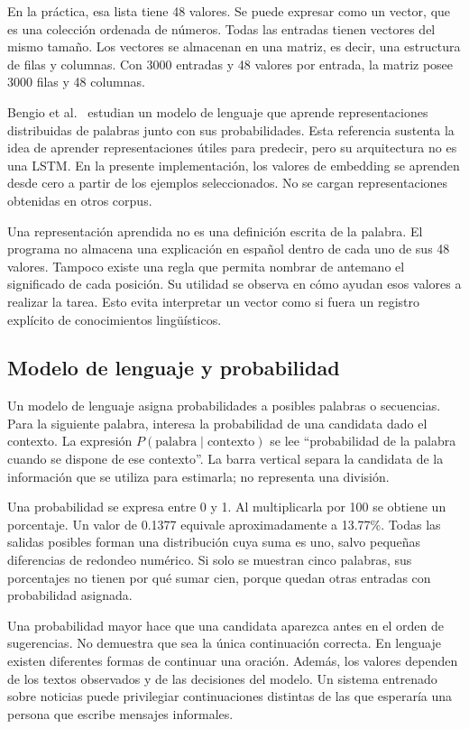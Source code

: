 En la práctica, esa lista tiene 48 valores. Se puede expresar como un vector, que es una colección ordenada de números. Todas las entradas tienen vectores del mismo tamaño. Los vectores se almacenan en una matriz, es decir, una estructura de filas y columnas. Con 3000 entradas y 48 valores por entrada, la matriz posee 3000 filas y 48 columnas.

Bengio et al.~\cite{bengio2003} estudian un modelo de lenguaje que aprende representaciones distribuidas de palabras junto con sus probabilidades. Esta referencia sustenta la idea de aprender representaciones útiles para predecir, pero su arquitectura no es una LSTM. En la presente implementación, los valores de embedding se aprenden desde cero a partir de los ejemplos seleccionados. No se cargan representaciones obtenidas en otros corpus.

Una representación aprendida no es una definición escrita de la palabra. El programa no almacena una explicación en español dentro de cada uno de sus 48 valores. Tampoco existe una regla que permita nombrar de antemano el significado de cada posición. Su utilidad se observa en cómo ayudan esos valores a realizar la tarea. Esto evita interpretar un vector como si fuera un registro explícito de conocimientos lingüísticos.

\subsection{Modelo de lenguaje y probabilidad}
Un modelo de lenguaje asigna probabilidades a posibles palabras o secuencias. Para la siguiente palabra, interesa la probabilidad de una candidata dado el contexto. La expresión $P(\text{palabra}\mid\text{contexto})$ se lee ``probabilidad de la palabra cuando se dispone de ese contexto''. La barra vertical separa la candidata de la información que se utiliza para estimarla; no representa una división.

Una probabilidad se expresa entre 0 y 1. Al multiplicarla por 100 se obtiene un porcentaje. Un valor de 0.1377 equivale aproximadamente a 13.77\%. Todas las salidas posibles forman una distribución cuya suma es uno, salvo pequeñas diferencias de redondeo numérico. Si solo se muestran cinco palabras, sus porcentajes no tienen por qué sumar cien, porque quedan otras entradas con probabilidad asignada.

Una probabilidad mayor hace que una candidata aparezca antes en el orden de sugerencias. No demuestra que sea la única continuación correcta. En lenguaje existen diferentes formas de continuar una oración. Además, los valores dependen de los textos observados y de las decisiones del modelo. Un sistema entrenado sobre noticias puede privilegiar continuaciones distintas de las que esperaría una persona que escribe mensajes informales.

